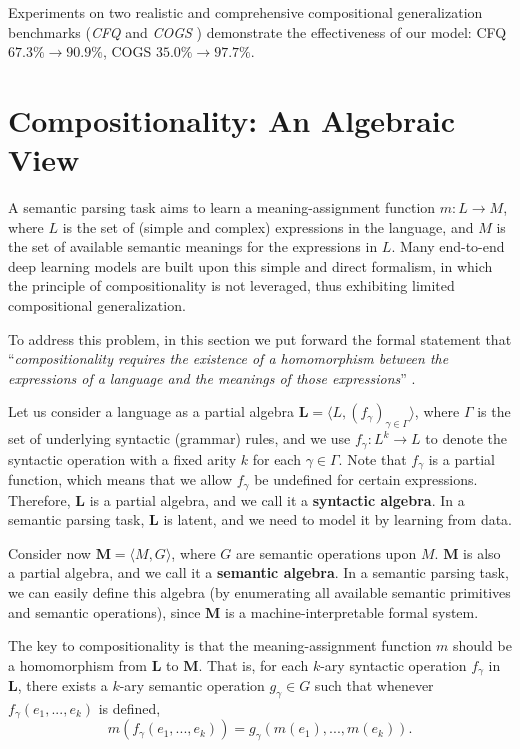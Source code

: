 \documentclass[11pt,a4paper]{article}
\begin{document}
Experiments on two realistic and comprehensive compositional generalization benchmarks (\textit{CFQ} \cite{keysers2019measuring} and \textit{COGS} \cite{kim2020cogs}) demonstrate the effectiveness of our model:
CFQ $67.3\%\to 90.9\%$, COGS $35.0\%\to 97.7\%$.



\section{Compositionality: An Algebraic View}\label{section:algebra}

A semantic parsing task aims to learn a meaning-assignment function $m: L\to M$, where $L$ is the set of (simple and complex) expressions in the language, and $M$ is the set of available semantic meanings for the expressions in $L$.
Many end-to-end deep learning models are built upon this simple and direct formalism, in which the principle of compositionality is not leveraged, thus exhibiting limited compositional generalization.

To address this problem, in this section we put forward the formal statement that ``\textit{compositionality requires the existence of a homomorphism between the expressions of a language and the meanings of those expressions}'' \cite{montague1970universal-algre}.

Let us consider a language as a partial algebra $\mathbf{L} = \langle L, (f_\gamma)_{\gamma\in\Gamma}\rangle$, where $\Gamma$ is the set of underlying syntactic (grammar) rules, and we use $f_\gamma: L^k\to L$ to denote the syntactic operation with a fixed arity $k$ for each $\gamma\in\Gamma$.
Note that $f_\gamma$ is a partial function, which means that we allow $f_\gamma$ be undefined for certain expressions.
Therefore, $\mathbf{L}$ is a partial algebra, and we call it a \textbf{syntactic algebra}.
In a semantic parsing task, $\mathbf{L}$ is latent, and we need to model it by learning from data.

Consider now $\mathbf{M} = \langle M, G\rangle$, where $G$ are semantic operations upon $M$.
$\textbf{M}$ is also a partial algebra, and we call it a \textbf{semantic algebra}.
In a semantic parsing task, we can easily define this algebra (by enumerating all available semantic primitives and semantic operations), since $\mathbf{M}$ is a machine-interpretable formal system.

The key to compositionality is that the meaning-assignment function $m$ should be a homomorphism from $\mathbf{L}$ to $\mathbf{M}$.
That is, for each $k$-ary syntactic operation $f_\gamma$ in $\mathbf{L}$,
there exists a $k$-ary semantic operation $g_\gamma\in G$ such that whenever $f_\gamma(e_1, ..., e_k)$ is defined,
\begin{equation}\label{eq:homo}
m(f_\gamma(e_1, ..., e_k)) = g_\gamma(m(e_1), ..., m(e_k)).
\end{equation}
\end{document}
